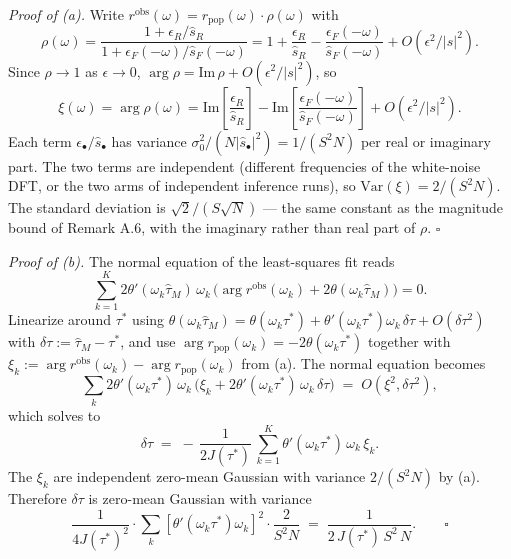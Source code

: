 \documentclass[
  letterpaper,
  11pt]{article}
\theoremstyle{plain}
\theoremstyle{definition}
\theoremstyle{remark}
\begin{document}
\emph{Proof of (a).} Write \(r^{\text{obs}}(\omega) = r_{\text{pop}}(\omega) \cdot \rho(\omega)\) with
\[\rho(\omega) = \frac{1 + \epsilon_R/\hat s_R}{1 + \epsilon_F(-\omega)/\hat s_F(-\omega)} = 1 + \frac{\epsilon_R}{\hat s_R} - \frac{\epsilon_F(-\omega)}{\hat s_F(-\omega)} + O(\epsilon^2/|s|^2).\]
Since \(\rho \to 1\) as \(\epsilon \to 0\), \(\arg\rho = \mathrm{Im}\,\rho + O(\epsilon^2/|s|^2)\), so
\[\xi(\omega) = \arg\rho(\omega) = \mathrm{Im}\!\left[\frac{\epsilon_R}{\hat s_R}\right] - \mathrm{Im}\!\left[\frac{\epsilon_F(-\omega)}{\hat s_F(-\omega)}\right] + O(\epsilon^2/|s|^2).\]
Each term \(\epsilon_\bullet/\hat s_\bullet\) has variance \(\sigma_0^2/(N|\hat s_\bullet|^2) = 1/(S^2 N)\) per real or imaginary part. The two terms are independent (different frequencies of the white-noise DFT, or the two arms of independent inference runs), so \(\mathrm{Var}(\xi) = 2/(S^2 N)\). The standard deviation is \(\sqrt{2}/(S\sqrt{N})\) --- the same constant as the magnitude bound of Remark A.6, with the imaginary rather than real part of \(\rho\). \(\square\)

\emph{Proof of (b).} The normal equation of the least-squares fit reads
\[\sum_{k=1}^K 2\theta'(\omega_k\hat\tau_M)\,\omega_k\,\bigl(\arg r^{\text{obs}}(\omega_k) + 2\theta(\omega_k\hat\tau_M)\bigr) = 0.\]
Linearize around \(\tau^*\) using \(\theta(\omega_k\hat\tau_M) = \theta(\omega_k\tau^*) + \theta'(\omega_k\tau^*)\omega_k\,\delta\tau + O(\delta\tau^2)\) with \(\delta\tau := \hat\tau_M - \tau^*\), and use \(\arg r_{\text{pop}}(\omega_k) = -2\theta(\omega_k\tau^*)\) together with \(\xi_k := \arg r^{\text{obs}}(\omega_k) - \arg r_{\text{pop}}(\omega_k)\) from (a). The normal equation becomes
\[\sum_k 2\theta'(\omega_k\tau^*)\,\omega_k\,\bigl(\xi_k + 2\theta'(\omega_k\tau^*)\,\omega_k\,\delta\tau\bigr) \;=\; O(\xi^2, \delta\tau^2),\]
which solves to
\[\delta\tau \;=\; -\,\frac{1}{2J(\tau^*)}\,\sum_{k=1}^K \theta'(\omega_k\tau^*)\,\omega_k\,\xi_k.\]
The \(\xi_k\) are independent zero-mean Gaussian with variance \(2/(S^2 N)\) by (a). Therefore \(\delta\tau\) is zero-mean Gaussian with variance
\[\frac{1}{4J(\tau^*)^2} \cdot \sum_k [\theta'(\omega_k\tau^*)\omega_k]^2 \cdot \frac{2}{S^2 N} \;=\; \frac{1}{2\,J(\tau^*)\,S^2\,N}. \qquad \square\]
\end{document}
